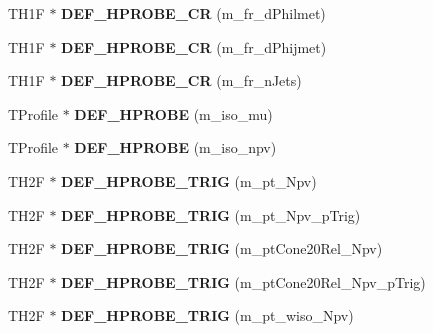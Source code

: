 \begin{DoxyCompactItemize}
\item 
\hypertarget{classHistos__Fake_a182df21c56a999049033d28308afb99d}{
TH1F $\ast$ {\bfseries DEF\_\-HPROBE\_\-CR} (m\_\-fr\_\-dPhilmet)}
\label{classHistos__Fake_a182df21c56a999049033d28308afb99d}

\item 
\hypertarget{classHistos__Fake_a9441b356832bfb77b21272133352ee29}{
TH1F $\ast$ {\bfseries DEF\_\-HPROBE\_\-CR} (m\_\-fr\_\-dPhijmet)}
\label{classHistos__Fake_a9441b356832bfb77b21272133352ee29}

\item 
\hypertarget{classHistos__Fake_a365c66542c9eeecaea8083fcdf497d93}{
TH1F $\ast$ {\bfseries DEF\_\-HPROBE\_\-CR} (m\_\-fr\_\-nJets)}
\label{classHistos__Fake_a365c66542c9eeecaea8083fcdf497d93}

\item 
\hypertarget{classHistos__Fake_a8a3445fb7502411aff0e7aa7ca8e6ee4}{
TProfile $\ast$ {\bfseries DEF\_\-HPROBE} (m\_\-iso\_\-mu)}
\label{classHistos__Fake_a8a3445fb7502411aff0e7aa7ca8e6ee4}

\item 
\hypertarget{classHistos__Fake_a11cf7eed1ec0c0b869f34e8d7fd5474a}{
TProfile $\ast$ {\bfseries DEF\_\-HPROBE} (m\_\-iso\_\-npv)}
\label{classHistos__Fake_a11cf7eed1ec0c0b869f34e8d7fd5474a}

\item 
\hypertarget{classHistos__Fake_ae12d3846c494475706ebaa356f6af716}{
TH2F $\ast$ {\bfseries DEF\_\-HPROBE\_\-TRIG} (m\_\-pt\_\-Npv)}
\label{classHistos__Fake_ae12d3846c494475706ebaa356f6af716}

\item 
\hypertarget{classHistos__Fake_ac051a97c241399314d422553ccd93a53}{
TH2F $\ast$ {\bfseries DEF\_\-HPROBE\_\-TRIG} (m\_\-pt\_\-Npv\_\-pTrig)}
\label{classHistos__Fake_ac051a97c241399314d422553ccd93a53}

\item 
\hypertarget{classHistos__Fake_a02e42401e9ce37fa02fa1e364d5c810c}{
TH2F $\ast$ {\bfseries DEF\_\-HPROBE\_\-TRIG} (m\_\-ptCone20Rel\_\-Npv)}
\label{classHistos__Fake_a02e42401e9ce37fa02fa1e364d5c810c}

\item 
\hypertarget{classHistos__Fake_a19ae4324b72811460740fb7a49749b12}{
TH2F $\ast$ {\bfseries DEF\_\-HPROBE\_\-TRIG} (m\_\-ptCone20Rel\_\-Npv\_\-pTrig)}
\label{classHistos__Fake_a19ae4324b72811460740fb7a49749b12}

\item 
\hypertarget{classHistos__Fake_a91a5f59a1d2bbb1663169a74975368c7}{
TH2F $\ast$ {\bfseries DEF\_\-HPROBE\_\-TRIG} (m\_\-pt\_\-wiso\_\-Npv)}
\label{classHistos__Fake_a91a5f59a1d2bbb1663169a74975368c7}


\end{DoxyCompactItemize}
